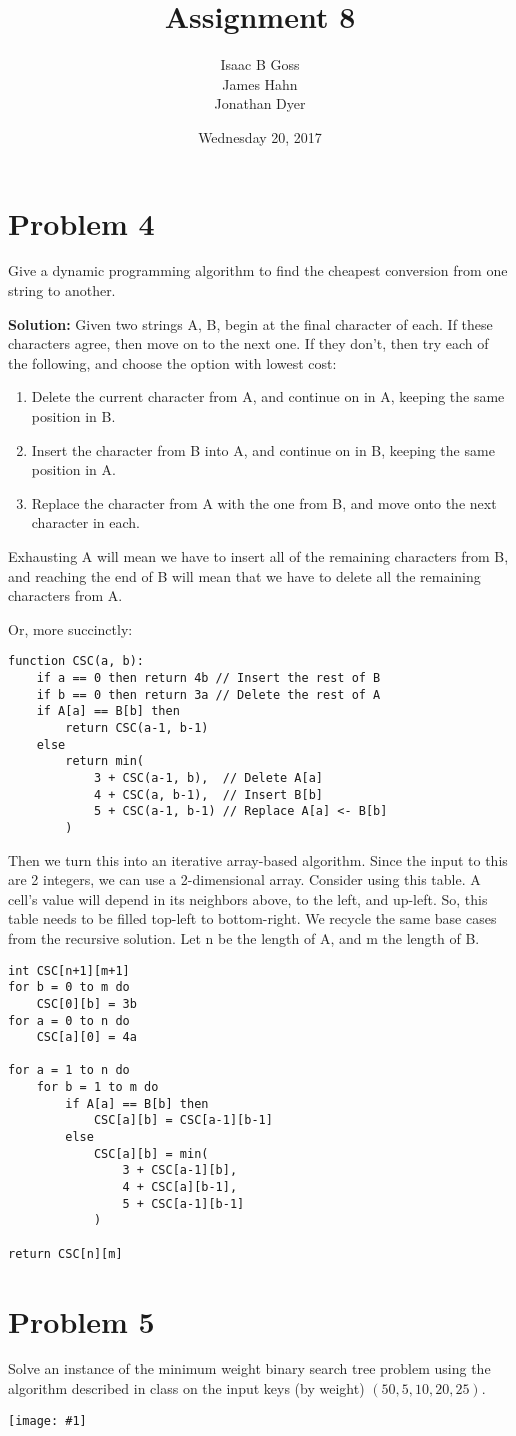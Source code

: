 \documentclass{article}
\author{Isaac B Goss\\ James Hahn\\ Jonathan Dyer}
\title{Assignment 8}
\date{Wednesday 20, 2017}
\providecommand{\prob}[1]{\section*{Problem #1}}
\providecommand{\soln}{\textbf{Solution: }}
\providecommand{\image}[1]{
    \begin{center}
        \texttt{[image: \#1]}
    \end{center}
}
\providecommand{\tightlist}{
    \setlength{\itemsep}{0pt}\setlength{\parskip}{0pt}
}
\begin{document}
\maketitle

    \prob{4}
    Give a dynamic programming algorithm to find the cheapest conversion from one string to another.
    
    \soln Given two strings A, B, begin at the final character of each.
    If these characters agree, then move on to the next one.
    If they don't, then try each of the following, and choose the option with lowest cost:
    \begin{enumerate}\tightlist
        \item Delete the current character from A, and continue on in A, keeping the same position in B.
        \item Insert the character from B into A, and continue on in B, keeping the same position in A.
        \item Replace the character from A with the one from B, and move onto the next character in each.
    \end{enumerate}

    Exhausting A will mean we have to insert all of the remaining characters from B, and reaching the end of B will mean that we have to delete all the remaining characters from A.
    
    Or, more succinctly:
    
    \begin{lstlisting}
function CSC(a, b):
    if a == 0 then return 4b // Insert the rest of B
    if b == 0 then return 3a // Delete the rest of A
    if A[a] == B[b] then
        return CSC(a-1, b-1)
    else
        return min(
            3 + CSC(a-1, b),  // Delete A[a]
            4 + CSC(a, b-1),  // Insert B[b]
            5 + CSC(a-1, b-1) // Replace A[a] <- B[b]
        )
    \end{lstlisting}

    Then we turn this into an iterative array-based algorithm.
    Since the input to this are 2 integers, we can use a 2-dimensional array.
    Consider using this table.
    A cell's value will depend in its neighbors above, to the left, and up-left.
    So, this table needs to be filled top-left to bottom-right.
    We recycle the same base cases from the recursive solution.
    Let n be the length of A, and m the length of B.
    
    \begin{lstlisting}
int CSC[n+1][m+1]
for b = 0 to m do
    CSC[0][b] = 3b
for a = 0 to n do
    CSC[a][0] = 4a

for a = 1 to n do
    for b = 1 to m do
        if A[a] == B[b] then
            CSC[a][b] = CSC[a-1][b-1]
        else
            CSC[a][b] = min(
                3 + CSC[a-1][b],
                4 + CSC[a][b-1],
                5 + CSC[a-1][b-1]
            )

return CSC[n][m]
    \end{lstlisting}
    
    \prob{5}
    Solve an instance of the minimum weight binary search tree problem using the algorithm described in class on the input keys (by weight) $(50, 5, 10, 20, 25)$.
    
    \image{pic}
\end{document}
